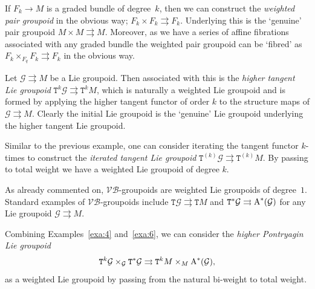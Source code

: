 \documentclass[pdftex]{sigma}
\newcommand{\rmA}{\textnormal{A}}
\def\sT{{\mathtt T}}
\numberwithin{equation}{section}
\begin{document}
\begin{Example}\label{exa:3}
If $F_{k} \rightarrow M$ is a graded bundle of degree~$k$, then we can construct the \emph{weighted pair groupoid} in the obvious way; $F_{k}\times F_{k} \rightrightarrows F_{k}$. Underlying this is the `genuine' pair groupoid $M \times M \rightrightarrows M$. Moreover, as we have a series of af\/f\/ine f\/ibrations associated with any graded bundle the weighted pair groupoid can be `f\/ibred' as $F_{k}\times_{F_{q}} F_{k} \rightrightarrows F_{k}$ in the obvious way.
\end{Example}

\begin{Example}\label{exa:4}
Let $\mathcal{G} \rightrightarrows M$ be a Lie groupoid. Then associated with this is the \emph{higher tangent Lie groupoid}  $\sT^{k}\mathcal{G} \rightrightarrows \sT^{k}M$, which is naturally a weighted Lie groupoid and is formed by applying the higher tangent functor of order $k$ to the structure maps of $\mathcal{G} \rightrightarrows M$. Clearly the initial Lie groupoid is the `genuine' Lie groupoid underlying the higher tangent Lie groupoid.
\end{Example}


\begin{Example}\label{exa:5}
Similar to the previous example, one can consider iterating  the tangent functor $k$-times to construct the \emph{iterated tangent Lie groupoid} $\sT^{(k)}\mathcal{G}\rightrightarrows \sT^{(k)}M$. By passing to total weight we have a weighted Lie groupoid of degree $k$.
\end{Example}

\begin{Example}\label{exa:6}
As already commented on,  $\mathcal{VB}$-groupoids are weighted Lie groupoids of degree~$1$.  Standard examples of $\mathcal{VB}$-groupoids include $\sT \mathcal{G} \rightrightarrows \sT M$ and $\sT^{*}\mathcal{G} \rightrightarrows \textnormal{A}^{*}(\mathcal{G})$ for any Lie groupoid $\mathcal{G} \rightrightarrows M$.
\end{Example}

\begin{Example}\label{exa:7}
Combining Examples~\ref{exa:4} and~\ref{exa:6}, we can consider the \emph{higher Pontryagin Lie groupoid}
\begin{gather*}
\sT^{k}\mathcal{G} \times_{\mathcal{G}} \sT^{*}\mathcal{G} \rightrightarrows \sT^{k}M \times_{M} \rmA^{*}(\mathcal{G}),
\end{gather*}
 as a weighted Lie groupoid by passing from the natural bi-weight to total weight.
\end{Example}
\end{document}
